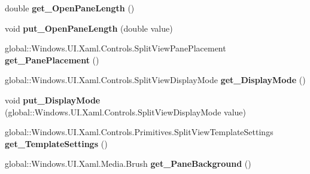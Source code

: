 \begin{DoxyCompactItemize}
double {\bfseries get\+\_\+\+Open\+Pane\+Length} ()
\item 
\mbox{\label{interface_windows_1_1_u_i_1_1_xaml_1_1_controls_1_1_i_split_view_a92b1399298c0fd5087100c36bd7fe8f5}} 
void {\bfseries put\+\_\+\+Open\+Pane\+Length} (double value)
\item 
\mbox{\label{interface_windows_1_1_u_i_1_1_xaml_1_1_controls_1_1_i_split_view_ab795867716cdcc78c0ee7c7f7cdb8a70}} 
global\+::\+Windows.\+U\+I.\+Xaml.\+Controls.\+Split\+View\+Pane\+Placement {\bfseries get\+\_\+\+Pane\+Placement} ()
\item 
\mbox{\label{interface_windows_1_1_u_i_1_1_xaml_1_1_controls_1_1_i_split_view_a5c6b5fd189586ae6a4809f2028b036e9}} 
global\+::\+Windows.\+U\+I.\+Xaml.\+Controls.\+Split\+View\+Display\+Mode {\bfseries get\+\_\+\+Display\+Mode} ()
\item 
\mbox{\label{interface_windows_1_1_u_i_1_1_xaml_1_1_controls_1_1_i_split_view_a31d4c4574b734f77622f95bc78b04c1a}} 
void {\bfseries put\+\_\+\+Display\+Mode} (global\+::\+Windows.\+U\+I.\+Xaml.\+Controls.\+Split\+View\+Display\+Mode value)
\item 
\mbox{\label{interface_windows_1_1_u_i_1_1_xaml_1_1_controls_1_1_i_split_view_a5d410ee30d731de0a395a350b650dabb}} 
global\+::\+Windows.\+U\+I.\+Xaml.\+Controls.\+Primitives.\+Split\+View\+Template\+Settings {\bfseries get\+\_\+\+Template\+Settings} ()
\item 
\mbox{\label{interface_windows_1_1_u_i_1_1_xaml_1_1_controls_1_1_i_split_view_a1c78e9b7f929fa0f024bfd75bd93b2b3}} 
global\+::\+Windows.\+U\+I.\+Xaml.\+Media.\+Brush {\bfseries get\+\_\+\+Pane\+Background} ()
\item 
\mbox{\label{interface_windows_1_1_u_i_1_1_xaml_1_1_controls_1_1_i_split_view_a097467d9287cc5b1864024d0d471fe18}} 

\end{DoxyCompactItemize}
